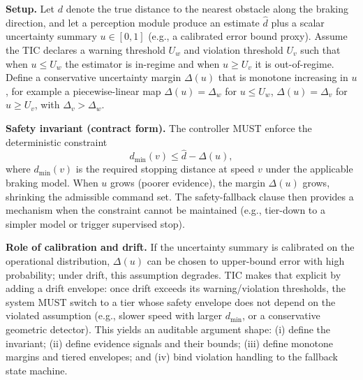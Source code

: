 \documentclass[smallextended]{svjour3}
\begin{document}
\noindent\textbf{Setup.} Let \(d\) denote the true distance to the nearest obstacle along
the braking direction, and let a perception module produce an estimate \(\hat d\) plus a
scalar uncertainty summary \(u\in[0,1]\) (e.g., a calibrated error bound proxy). Assume
the TIC declares a warning threshold \(U_w\) and violation threshold \(U_v\) such that
when \(u\le U_w\) the estimator is in-regime and when \(u\ge U_v\) it is out-of-regime.
Define a conservative uncertainty margin \(\Delta(u)\) that is monotone increasing in
\(u\), for example a piecewise-linear map \(\Delta(u)=\Delta_w\) for \(u\le U_w\),
\(\Delta(u)=\Delta_v\) for \(u\ge U_v\), with \(\Delta_v>\Delta_w\).

\noindent\textbf{Safety invariant (contract form).} The controller MUST enforce the
deterministic constraint
\[
  d_{\min}(\!v\!) \le \hat d - \Delta(u),
\]
where \(d_{\min}(v)\) is the required stopping distance at speed \(v\) under the
applicable braking model. When \(u\) grows (poorer evidence), the margin \(\Delta(u)\)
grows, shrinking the admissible command set. The safety-fallback clause then provides a
mechanism when the constraint cannot be maintained (e.g., tier-down to a simpler model or
trigger supervised stop).

\noindent\textbf{Role of calibration and drift.} If the uncertainty summary is calibrated
on the operational distribution, \(\Delta(u)\) can be chosen to upper-bound error with
high probability; under drift, this assumption degrades. TIC makes that explicit by
adding a drift envelope: once drift exceeds its warning/violation thresholds, the system
MUST switch to a tier whose safety envelope does not depend on the violated assumption
(e.g., slower speed with larger \(d_{\min}\), or a conservative geometric detector).
This yields an auditable argument shape: (i) define the invariant; (ii) define evidence
signals and their bounds; (iii) define monotone margins and tiered envelopes; and (iv)
bind violation handling to the fallback state machine.
\end{document}
